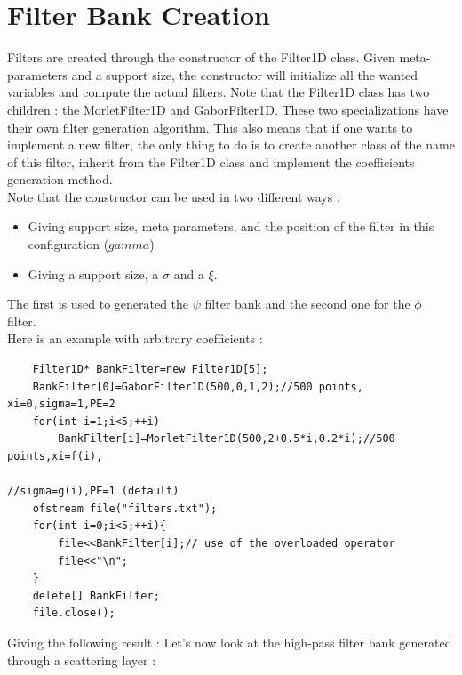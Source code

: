 \documentclass[a4paper]{report}
\begin{document}
\section{Filter Bank Creation}
Filters are created through the constructor of the Filter1D class. Given meta-parameters and a support size, the constructor will initialize all the wanted variables and compute the actual filters. Note that the Filter1D class has two children : the MorletFilter1D and GaborFilter1D. These two specializations have their own filter generation algorithm. This also means that if one wants to implement a new filter, the only thing to do is to create another class of the name of this filter, inherit from the Filter1D class and implement the coefficients generation method.
\\Note that the constructor can be used in two different ways :
\begin{itemize}
\item Giving support size, meta parameters, and the position of the filter in this configuration ($gamma$)
\item Giving a support size, a $\sigma$ and a $\xi$.
\end{itemize}
The first is used to generated the $\psi$ filter bank and the second one for the $\phi$ filter.
\\
Here is an example with arbitrary coefficients :
\begin{lstlisting}
    Filter1D* BankFilter=new Filter1D[5];
    BankFilter[0]=GaborFilter1D(500,0,1,2);//500 points, xi=0,sigma=1,PE=2
    for(int i=1;i<5;++i)
        BankFilter[i]=MorletFilter1D(500,2+0.5*i,0.2*i);//500 points,xi=f(i),
                                                        //sigma=g(i),PE=1 (default)
    ofstream file("filters.txt");
    for(int i=0;i<5;++i){
        file<<BankFilter[i];// use of the overloaded operator
        file<<"\n";
    }
    delete[] BankFilter;
    file.close();

\end{lstlisting}
Giving the following result :
Let's now look at the high-pass filter bank generated through a scattering layer :
\end{document}
